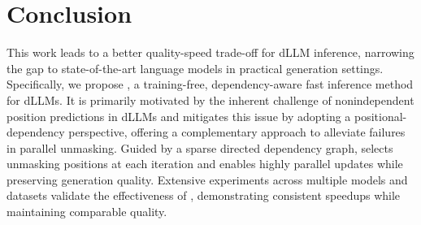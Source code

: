 \section{Conclusion}
This work leads to a better quality-speed trade-off for dLLM inference, narrowing the gap to state-of-the-art language models in practical generation settings. Specifically, we propose \textbf{\dawn{}}, a training-free, dependency-aware fast inference method for dLLMs.
It is primarily motivated by the inherent challenge of nonindependent position predictions in dLLMs and mitigates this issue by adopting a positional-dependency perspective, offering a complementary approach to alleviate failures in parallel unmasking.
Guided by a sparse directed dependency graph, \dawn{} selects unmasking positions at each iteration and enables highly parallel updates while preserving generation quality. 
Extensive experiments across multiple models and datasets validate the effectiveness of \dawn{}, demonstrating consistent speedups while maintaining comparable quality.
